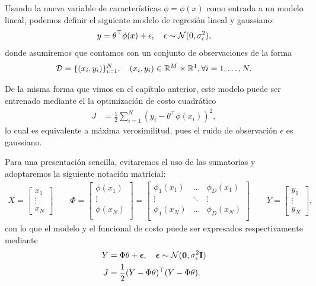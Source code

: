 Usando la nueva variable de  características $\phi=\phi(x)$ como entrada a un modelo lineal, podemos definir el siguiente modelo de regresión lineal y gaussiano: 
\begin{equation}
    y = \theta^\top\phi(x) + \epsilon,\quad \epsilon\sim{\mathcal N}(0,\sigma_\epsilon^2)\label{eq:reg_no_lin},
\end{equation}
donde asumiremos que contamos con un conjunto de observaciones de la forma
\begin{equation}
    {\mathcal D} = \{(x_i,y_i)\}_{i=1}^N,\quad (x_i, y_i)\in{\mathbb R}^M\times{\mathbb R}^1,\forall i=1,\ldots,N.
    \label{eq:training_set_nl}
\end{equation}

De la misma forma que vimos en el capítulo anterior, este modelo puede ser entrenado mediante el la optimización de costo cuadrático
\begin{align}
    J &= \frac{1}{2} \sum_{i=1}^N(y_i - \theta^\top\phi(x_i))^2,
\end{align}
lo cual es equivalente a máxima verosimilitud, pues el ruido de observación $\epsilon$ es gaussiano.

Para una presentación sencilla, evitaremos el uso de las sumatorias y adoptaremos la siguiente notación matricial:
\begin{align}
    X = \left[ \begin{matrix} x_1 \\ \vdots \\ x_N \end{matrix} \right]\qquad
    \Phi = 
    \left[ \begin{matrix} \phi(x_1)\\
    \vdots \\
    \phi(x_N)\\
    \end{matrix} \right]
     = \left[ \begin{matrix} \phi_1(x_1)& \ldots & \phi_D(x_1)\\
    \vdots & \ddots & \vdots \\
    \phi_1(x_N) & \ldots & \phi_D(x_N)\\
    \end{matrix} \right]
    \qquad
    Y = \left[ \begin{matrix} y_1 \\ \vdots \\ y_N \end{matrix} \right],
\end{align}
con lo que el modelo y el funcional de costo puede ser expresados respectivamente mediante
\begin{align}
    Y &= \Phi\theta + {\bm \epsilon},\quad {\bm \epsilon}\sim{\mathcal N}(\mathbf{0},\sigma_\epsilon^2\mathbf{I})\\
    J &= \frac{1}{2} (Y-\Phi\theta)^\top(Y-\Phi\theta).
\end{align}

